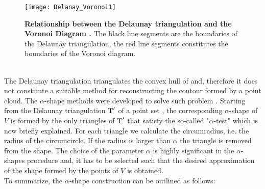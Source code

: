 \begin{figure}[t]
\centering
\texttt{[image: Delanay\_Voronoi1]}
\caption{\textbf{Relationship between the Delaunay triangulation and the Voronoi Diagram \cite{Wiki4}.} The black line segments are the boundaries of the Delaunay triangulation, the red line segments constitutes the boundaries of the Voronoi diagram.}
\label{fig:Voronoi}
\end{figure}
\\ \indent The Delaunay triangulation triangulates the convex hull of  and, therefore it does not constitute a suitable method for reconstructing the contour formed by a point cloud. The $\alpha$-shape methods were developed to solve such problem \cite{edelsbrunner2010alpha, guo1997surface}. Starting from the Delaunay triangulation $\mbox{$\textup{T}$}^\prime$ of a point set , the corresponding $\alpha$-shape of $V$ is formed by the only triangles of $\mbox{$\textup{T}$}^\prime$ that satisfy the so-called "$\alpha$-test" which is now briefly explained.
For each triangle we calculate the circumradius, i.e. the radius of the circumcircle. If the radius is larger than $\alpha$ the triangle is removed from the shape. The choice of the parameter $\alpha$ is highly significant in the $\alpha$-shapes procedure and, it has to be selected such that the desired approximation of the shape formed by the points of $V$ is obtained.\\ \indent
To summarize, the $\alpha$-shape construction can be outlined as follows:
